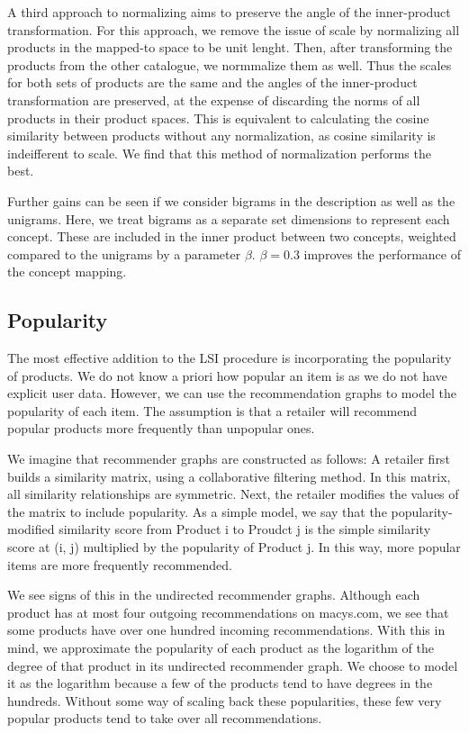 \documentclass[11pt]{article}
\begin{document}
A third approach to normalizing aims to preserve the angle of the inner-product
transformation. For this approach, we remove the issue of scale by normalizing
all products in the mapped-to space to be unit lenght. Then, after transforming
the products from the other catalogue, we normmalize them as well. Thus the
scales for both sets of products are the same and the angles of the
inner-product transformation are preserved, at the expense of discarding the
norms of all products in their product spaces. This is equivalent to calculating
the cosine similarity between products without any normalization, as cosine
similarity is indeifferent to scale. We find that this method of normalization
performs the best.

Further gains can be seen if we consider bigrams in the description as well as
the unigrams. Here, we treat bigrams as a separate set dimensions to represent
each concept. These are included in the inner product between two concepts,
weighted compared to the unigrams by a parameter $\beta$. $\beta = 0.3$ improves the
performance of the concept mapping.

\subsection*{Popularity}
The most effective addition to the LSI procedure is incorporating the popularity
of products. We do not know a priori how popular an item is as we do not have
explicit user data. However, we can use the recommendation graphs to model the
popularity of each item. The assumption is that a retailer will recommend
popular products more frequently than unpopular ones.

We imagine that recommender graphs are constructed as follows: A retailer first
builds a similarity matrix, using a collaborative filtering method. In this
matrix, all similarity relationships are symmetric. Next, the retailer modifies
the values of the matrix to include popularity. As a simple model, we say that
the popularity-modified similarity score from Product i to Proudct j is the
simple similarity score at (i, j) multiplied by the popularity of Product j. In
this way, more popular items are more frequently recommended. 

We see signs of this in the undirected recommender graphs. Although each product
has at most four outgoing recommendations on macys.com, we see that some
products have over one hundred incoming recommendations. With this in mind, we
approximate the popularity of each product as the logarithm of the degree of
that product in its undirected recommender graph. We choose to model it as the
logarithm because a few of the products tend to have degrees in the hundreds.
Without some way of scaling back these popularities, these few very popular
products tend to take over all recommendations.
\end{document}
